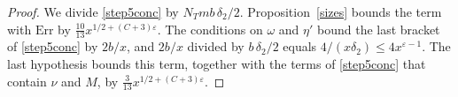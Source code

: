 \begin{proof}
We divide \eqref{step5conc} by $N_Tmb\,\delta_2/2$. Proposition~\ref{sizes} bounds the term with $\mathrm{Err}$ by $\frac{10}{13}x^{1/2+(C+3)\varepsilon}$. The conditions on $\omega$ and $\eta'$ bound the last bracket of \eqref{step5conc} by $2b/x$, and $2b/x$ divided by $b\,\delta_2/2$ equals $4/(x\delta_2)\le4x^{\varepsilon-1}$. The last hypothesis bounds this term, together with the terms of \eqref{step5conc} that contain $\nu$ and $M$, by $\frac3{13}x^{1/2+(C+3)\varepsilon}$.
\end{proof}
